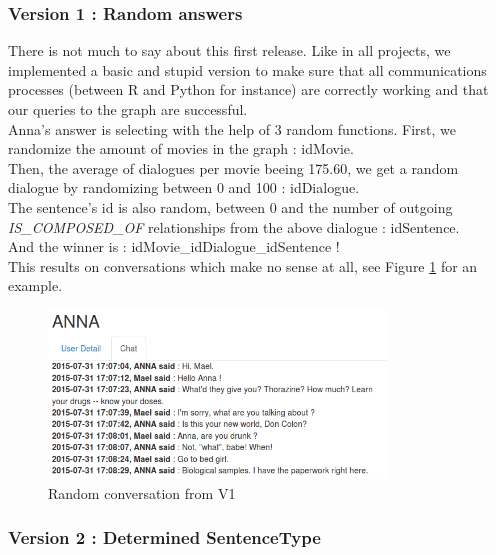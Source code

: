 \subsubsection{Version 1 : Random answers}
\label{sssec:v_rand}
There is not much to say about this first release. Like in all projects, we implemented a basic and stupid version to make sure that all communications processes (between R and Python for instance) are correctly working and that our queries to the graph are successful.\\
Anna's answer is selecting with the help of 3 random functions. First, we randomize the amount of movies in the graph : idMovie.\\
Then, the average of dialogues per movie beeing 175.60, we get a random dialogue by randomizing between 0 and 100 : idDialogue.\\
The sentence's id is also random, between 0 and the number of outgoing \textit{IS\_COMPOSED\_OF} relationships from the above dialogue : idSentence.\\
And the winner is : idMovie\_idDialogue\_idSentence !\\
This results on conversations which make no sense at all, see Figure \ref{fig:convRandom} for an example.\\
\begin{figure}[!h]
\begin{center}
\includegraphics[width=0.80\textwidth]{./img/convRandom.png}
\end{center}
\caption{Random conversation from V1}
\label{fig:convRandom}
\end{figure}
\subsubsection{Version 2 : Determined SentenceType}
\label{sssec:v_stype}

